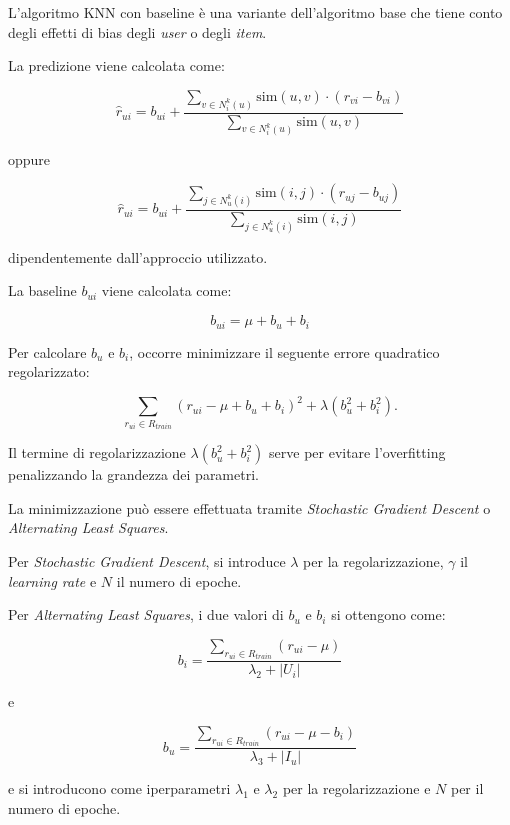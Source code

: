 L'algoritmo KNN con baseline \cite{KNN_baseline} è una variante dell'algoritmo base che tiene conto degli effetti di bias degli \textit{user} o degli \textit{item}.

La predizione viene calcolata come:

\[
\hat{r}_{ui} = b_{ui} + \frac{\sum\limits_{v \in N^k_i(u)} \text{sim}(u, v) \cdot (r_{vi} - b_{vi})}{\sum\limits_{v \in N^k_i(u)} \text{sim}(u, v)}
\]

oppure

\[
\hat{r}_{ui} = b_{ui} + \frac{\sum\limits_{j \in N^k_u(i)} \text{sim}(i, j) \cdot (r_{uj} - b_{uj})}{\sum\limits_{j \in N^k_u(i)} \text{sim}(i, j)}
\]

dipendentemente dall'approccio utilizzato.

La baseline $b_{ui}$ viene calcolata come:

\[
b_{ui} = \mu + b_u + b_i
\]

Per calcolare $b_u$ e $b_i$, occorre minimizzare il seguente errore quadratico regolarizzato:

\[
\sum\limits_{r_{ui} \in R_{train}} \left(r_{ui} - \mu + b_u + b_i\right)^2 + \lambda \left(b_u^2 + b_i^2 \right).
\]

Il termine di regolarizzazione $\lambda \left(b_u^2 + b_i^2 \right)$ serve per evitare l'overfitting penalizzando la grandezza dei parametri.

La minimizzazione può essere effettuata tramite \textit{Stochastic Gradient Descent} o \textit{Alternating Least Squares}.

Per \textit{Stochastic Gradient Descent}, si introduce $\lambda$ per la regolarizzazione, $\gamma$ il \textit{learning rate} e $N$ il numero di epoche.

Per \textit{Alternating Least Squares}, i due valori di $b_u$ e $b_i$ si ottengono come:

\[
b_i = \frac{\sum\limits_{r_{ui} \in R_{train}} (r_{ui} - \mu)}{\lambda_2 + |U_i|}
\]

e

\[
b_u = \frac{\sum\limits_{r_{ui} \in R_{train}} (r_{ui} - \mu - b_i)}{\lambda_3 + |I_u|}
\]

e si introducono come iperparametri $\lambda_1$ e $\lambda_2$ per la regolarizzazione e $N$ per il numero di epoche.

